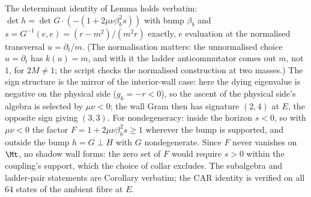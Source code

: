 The determinant identity of Lemma  holds verbatim: $\det h = \det G \cdot (-(1 + 2\mu\nu\beta_b^2 s))$ with bump $\beta_b$ and $s = G^{-1}(e,e) = (r - m^2)/(m^2 r)$ exactly, $e$ evaluation at the normalised transversal $u = \partial_t/m$. (The normalisation matters: the unnormalised choice $u = \partial_t$ has $k(u) = m$, and with it the ladder anticommutator comes out $m$, not $1$, for $2M \neq 1$; the script checks the normalised construction at two masses.) The sign structure is the mirror of the interior-wall case: here the dying eigenvalue is negative on the physical side ($g_k = -r < 0$), so the ascent of the physical side's algebra is selected by $\mu\nu < 0$; the wall Gram then has signature $(2,4)$ at $E$, the opposite sign giving $(3,3)$. For nondegeneracy: inside the horizon $s < 0$, so with $\mu\nu < 0$ the factor $F = 1 + 2\mu\nu\beta_b^2 s \geq 1$ wherever the bump is supported, and outside the bump $h = G \perp H$ with $G$ nondegenerate. Since $F$ never vanishes on $\Mt$, no shadow wall forms: the zero set of $F$ would require $s > 0$ within the coupling's support, which the choice of collar excludes. The subalgebra and ladder-pair statements are Corollary  verbatim; the CAR identity is verified on all $64$ states of the ambient fibre at $E$.
